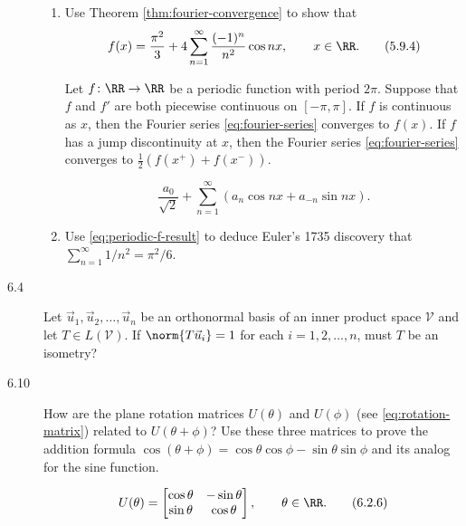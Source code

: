 \documentclass{homework}
\begin{document}
\begin{description}
  \begin{enumerate}
  \item Use Theorem \ref{thm:fourier-convergence} to show that
    \[
      f(x) = \frac{\pi^2}{3} +
      4 \sum_{n=1}^\infty \frac{(-1)^n}{n^2} \cos nx, \qquad
      x \in \RR.
      \tag{5.9.4}
      \label{eq:periodic-f-result}
    \]

    \begin{booktheorem}[5.8.18]
      Let \(f \colon \RR \to \RR\) be a periodic function with period
      \(2\pi\).  Suppose that \(f\) and \(f'\) are both piecewise
      continuous on \([-\pi, \pi]\).  If \(f\) is continuous as \(x\),
      then the Fourier series \eqref{eq:fourier-series} converges to
      \(f(x)\).  If \(f\) has a jump discontinuity at \(x\), then the
      Fourier series \eqref{eq:fourier-series} converges to
      \(\frac 1 2 (f(x^+) + f(x^-))\).

      \[
        \frac{a_0}{\sqrt 2} +
        \sum_{n=1}^\infty (a_n \cos nx + a_{-n} \sin nx).
        \tag{5.8.16}
        \label{eq:fourier-series}
      \]
    \end{booktheorem}

    \begin{solution}

    \end{solution}

  \item Use \eqref{eq:periodic-f-result} to deduce Euler's 1735
    discovery that \(\sum_{n=1}^\infty 1/n^2 = \pi^2/6\).

    \begin{solution}

    \end{solution}
  \end{enumerate}

\item[6.4] Let \(\vec u_1, \vec u_2, \dots, \vec u_n\) be an
  orthonormal basis of an inner product space \(\mathcal V\) and let
  \(T \in L(\mathcal V)\).  If \(\norm{T \vec u_i} = 1\) for each
  \(i = 1, 2, \dots, n\), must \(T\) be an isometry?

  \begin{solution}

  \end{solution}

\item[6.10] How are the plane rotation matrices \(U(\theta)\) and
  \(U(\phi)\) (see \eqref{eq:rotation-matrix}) related to
  \(U(\theta+\phi)\)?  Use these three matrices to prove the addition
  formula
  \(\cos(\theta+\phi) = \cos\theta \cos\phi - \sin\theta \sin\phi\)
  and its analog for the sine function.
  \begin{book}
    \[
      U(\theta) =
      \begin{bmatrix}
        \cos \theta & -\sin \theta \\
        \sin \theta &  \cos \theta
      \end{bmatrix},
      \qquad
      \theta \in \RR.
      \tag{6.2.6}
      \label{eq:rotation-matrix}
    \]
  \end{book}


\end{description}
\end{document}
